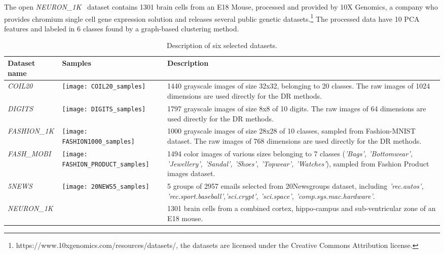 The open \emph{NEURON\_1K}~\cite{neuron1k} dataset contains 1301 brain cells from an E18 Mouse, processed and provided by 10X Genomics, a company who provides chromium single cell gene expression solution and releases several public genetic datasets.\footnote{https://www.10xgenomics.com/resources/datasets/, the datasets are licensed under the Creative Commons Attribution license.}
The processed data have 10 PCA features and labeled in 6 classes found by a graph-based clustering method.


\begin{table*}%
\caption{Description of six selected datasets.}\label{tbl:dataset}
\begin{tabular}{m{2.2cm} m{5.4cm} m{7.4cm}}
\toprule
Dataset name & Samples & Description \\
\midrule

\emph{COIL20}
    & \texttt{[image: COIL20\_samples]}
    & 1440 grayscale images of size 32x32, belonging to 20 classes.
    The raw images of 1024 dimensions are used directly for the DR methods.\\

\emph{DIGITS}
    & \texttt{[image: DIGITS\_samples]}
    & 1797 grayscale images of size 8x8 of 10 digits.
    The raw images of 64 dimensions are used directly for the DR methods.\\

\emph{FASHION\_1K}
    & \texttt{[image: FASHION1000\_samples]}
    & 1000 grayscale images of size 28x28 of 10 classes, sampled from Fashion-MNIST dataset.
    The raw images of 768 dimensions are used directly for the DR methods.\\

\emph{FASH\_MOBI}
    & \texttt{[image: FASHION\_PRODUCT\_samples]}
    & 1494 color images of various sizes belonging to 7 classes
    (\emph{'Bags', 'Bottomwear', 'Jewellery', 'Sandal', 'Shoes', 'Topwear', 'Watches'}),
    sampled from Fashion Product images dataset.\\

\emph{5NEWS}
    & \texttt{[image: 20NEWS5\_samples]}
    & 5 groups of 2957 emails selected from 20Newsgroups dataset,
    including \emph{'rec.autos', 'rec.sport.baseball','sci.crypt', 'sci.space', 'comp.sys.mac.hardware'}. \\

\emph{NEURON\_1K}
    &
    & 1301 brain cells from a combined cortex, hippo-campus and sub-ventricular zone of an E18 mouse. \\

\bottomrule
\end{tabular}
\end{table*}

